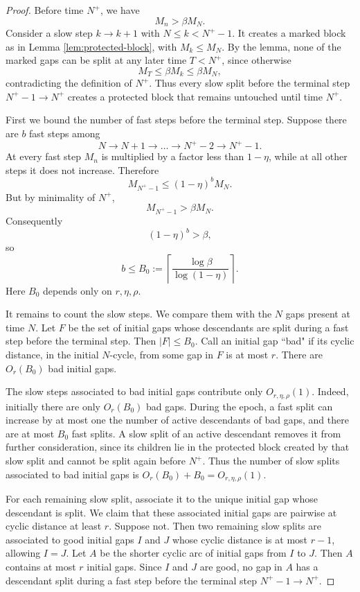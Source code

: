 \documentclass[10pt,a4paper]{amsart}
\begin{document}
\begin{proof}
Before time $N^+$, we have
\[
    M_n>\beta M_N .
\]
Consider a slow step $k\to k+1$ with $N\leq k<N^+-1$. It creates a marked block as in Lemma \ref{lem:protected-block}, with $M_k\leq M_N$. By the lemma, none of the marked gaps can be split at any later time $T<N^+$, since otherwise
\[
    M_T\leq \beta M_k\leq \beta M_N,
\]
contradicting the definition of $N^+$. Thus every slow split before the terminal step $N^+-1\to N^+$ creates a protected block that remains untouched until time $N^+$.

\bigskip
\noindent
First we bound the number of fast steps before the terminal step. Suppose there are $b$ fast steps among
\[
    N\to N+1\to\dots\to N^+-2\to N^+-1.
\]
At every fast step $M_n$ is multiplied by a factor less than $1-\eta$, while at all other steps it does not increase. Therefore
\[
    M_{N^+-1}\leq (1-\eta)^b M_N.
\]
But by minimality of $N^+$,
\[
    M_{N^+-1}>\beta M_N.
\]
Consequently
\[
    (1-\eta)^b>\beta,
\]
so
\[
    b\leq B_0:=\left\lceil\frac{\log \beta}{\log(1-\eta)}\right\rceil .
\]
Here $B_0$ depends only on $r,\eta,\rho$.

\bigskip
\noindent
It remains to count the slow steps. We compare them with the $N$ gaps present at time $N$. Let $F$ be the set of initial gaps whose descendants are split during a fast step before the terminal step. Then $|F|\leq B_0$. Call an initial gap ``bad" if its cyclic distance, in the initial $N$-cycle, from some gap in $F$ is at most $r$. There are $O_r(B_0)$ bad initial gaps.

\bigskip
\noindent
The slow steps associated to bad initial gaps contribute only $O_{r,\eta,\rho}(1)$. Indeed, initially there are only $O_r(B_0)$ bad gaps. During the epoch, a fast split can increase by at most one the number of active descendants of bad gaps, and there are at most $B_0$ fast splits. A slow split of an active descendant removes it from further consideration, since its children lie in the protected block created by that slow split and cannot be split again before $N^+$. Thus the number of slow splits associated to bad initial gaps is $O_r(B_0)+B_0=O_{r,\eta,\rho}(1)$.

\bigskip
\noindent
For each remaining slow split, associate it to the unique initial gap whose descendant is split. We claim that these associated initial gaps are pairwise at cyclic distance at least $r$. Suppose not. Then two remaining slow splits are associated to good initial gaps $I$ and $J$ whose cyclic distance is at most $r-1$, allowing $I=J$. Let $A$ be the shorter cyclic arc of initial gaps from $I$ to $J$. Then $A$ contains at most $r$ initial gaps. Since $I$ and $J$ are good, no gap in $A$ has a descendant split during a fast step before the terminal step $N^+-1\to N^+$.


\end{proof}
\end{document}
